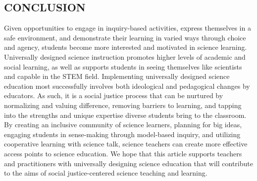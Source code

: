 \documentclass[11.5pt]{sig-alternate}
\begin{document}
\begin{large}
\section*{CONCLUSION}
Given opportunities to engage in inquiry-based activities, express themselves in a safe environment, and demonstrate their learning in varied ways through choice and agency, students become more interested and motivated in science learning. Universally designed science instruction promotes higher levels of academic and social learning, as well as supports students in seeing themselves like scientists and capable in the STEM field. Implementing universally designed science education most successfully involves both ideological and pedagogical changes by educators. As such, it is a social justice process that can be nurtured by normalizing and valuing difference, removing barriers to learning, and tapping into the strengths and unique expertise diverse students bring to the classroom. By creating an inclusive community of science learners, planning for big ideas, engaging students in sense-making through model-based inquiry, and utilizing cooperative learning with science talk, science teachers can create more effective access points to science education. We hope that this article supports teachers and practitioners with universally designing science education that will contribute to the aims of social justice-centered science teaching and learning.  


\end{large}
\end{document}
